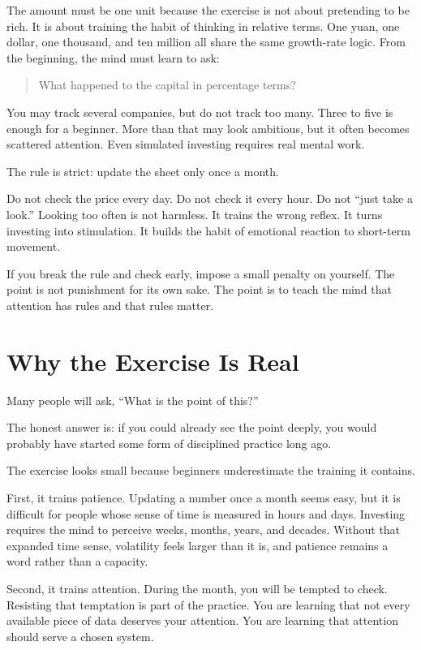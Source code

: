 The amount must be one unit because the exercise is not about pretending to be rich. It is about training the habit of thinking in relative terms. One yuan, one dollar, one thousand, and ten million all share the same growth-rate logic. From the beginning, the mind must learn to ask:

\begin{quote}
What happened to the capital in percentage terms?
\end{quote}

You may track several companies, but do not track too many. Three to five is enough for a beginner. More than that may look ambitious, but it often becomes scattered attention. Even simulated investing requires real mental work.

The rule is strict: update the sheet only once a month.

Do not check the price every day. Do not check it every hour. Do not ``just take a look.'' Looking too often is not harmless. It trains the wrong reflex. It turns investing into stimulation. It builds the habit of emotional reaction to short-term movement.

If you break the rule and check early, impose a small penalty on yourself. The point is not punishment for its own sake. The point is to teach the mind that attention has rules and that rules matter.

\section*{Why the Exercise Is Real}

Many people will ask, ``What is the point of this?''

The honest answer is: if you could already see the point deeply, you would probably have started some form of disciplined practice long ago.

The exercise looks small because beginners underestimate the training it contains.

First, it trains patience. Updating a number once a month seems easy, but it is difficult for people whose sense of time is measured in hours and days. Investing requires the mind to perceive weeks, months, years, and decades. Without that expanded time sense, volatility feels larger than it is, and patience remains a word rather than a capacity.

Second, it trains attention. During the month, you will be tempted to check. Resisting that temptation is part of the practice. You are learning that not every available piece of data deserves your attention. You are learning that attention should serve a chosen system.


